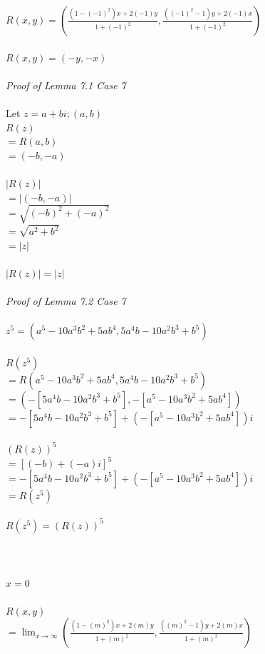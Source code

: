 \documentclass{article}
\begin{document}
\\
\\
$R(x,y) = (\frac{(1-(-1)^2)x+2(-1)y}{1+(-1)^2}, \frac{((-1)^2-1)y+2(-1)x}{1+(-1)^2})$
\\
\\$R(x,y) = (-y, -x)$
\\
\\\textit{Proof of Lemma 7.1 Case 7}
\\
\\Let $z=a+bi; (a,b)$
\\$R(z)$
\\$= R(a,b)$
\\$= (-b, -a)$
\\
\\$|R(z)|$
\\$=|(-b,-a)| $
\\$= \sqrt{(-b)^2 + (-a)^2}$
\\$= \sqrt{a^2 + b^2}$
\\$= |z|$
\\
\\$|R(z)| = |z|$
\\
\\\textit{Proof of Lemma 7.2 Case 7}
\\
\\$z^5 = (a^5-10a^3b^2+5ab^4, 5a^4b-10a^2b^3+b^5)$
\\
\\$R(z^5)$
\\$= R(a^5-10a^3b^2+5ab^4, 5a^4b-10a^2b^3+b^5)$
\\$= (-[5a^4b-10a^2b^3+b^5], -[a^5-10a^3b^2+5ab^4])$
\\$= -[5a^4b-10a^2b^3+b^5] + (-[a^5-10a^3b^2+5ab^4])i$
\\
\\$(R(z))^5$
\\$= [(-b)+(-a)i]^5$
\\$= -[5a^4b-10a^2b^3+b^5] + (-[a^5-10a^3b^2+5ab^4])i$
\\$= R(z^5)$
\\
\\$R(z^5) = (R(z))^5$
\\
\\
\\
\\
\underline{$x=0$}                %
\\
\\
$R(x,y)$
\\$= \lim_{x \to \infty} (\frac{(1-(m)^2)x+2(m)y}{1+(m)^2}, \frac{((m)^2-1)y+2(m)x}{1+(m)^2})$
\end{document}
